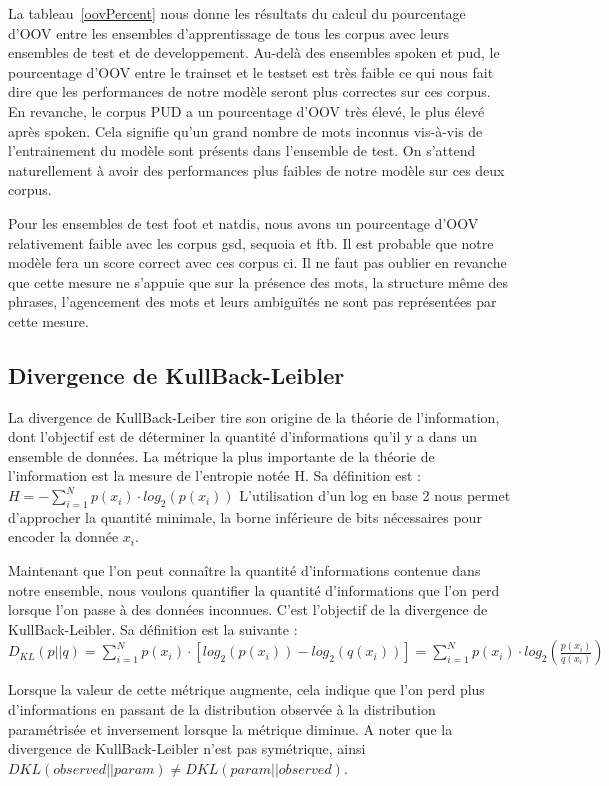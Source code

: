 \documentclass[french, 14pt]{memoir}
\begin{document}
La tableau~\ref{oovPercent} nous donne les résultats du calcul du pourcentage d'OOV entre les ensembles d'apprentissage de tous les corpus avec leurs ensembles de test et de developpement. Au-delà des ensembles spoken et pud, le pourcentage d'OOV entre le trainset et le testset est très faible ce qui nous fait dire que les performances de notre modèle seront plus correctes sur ces corpus. En revanche, le corpus PUD a un pourcentage d'OOV très élevé, le plus élevé après spoken. Cela signifie qu'un grand nombre de mots inconnus vis-à-vis de l'entrainement du modèle sont présents dans l'ensemble de test. On s'attend naturellement à avoir des performances plus faibles de notre modèle sur ces deux corpus. 

Pour les ensembles de test foot et natdis, nous avons un pourcentage d'OOV relativement faible avec les corpus gsd, sequoia et ftb. Il est probable que notre modèle fera un score correct avec ces corpus ci. Il ne faut pas oublier en revanche que cette mesure ne s'appuie que sur la présence des mots, la structure même des phrases, l'agencement des mots et leurs ambiguïtés ne sont pas représentées par cette mesure. 

\subsection{Divergence de KullBack-Leibler}

La divergence de KullBack-Leiber tire son origine de la théorie de l'information, dont l'objectif est de déterminer la quantité d'informations qu'il y a dans un ensemble de données. La métrique la plus importante de la théorie de l'information est la mesure de l'entropie notée H. Sa définition est :
$H = -\sum_{i=1}^{N} p(x_i)\cdot log_2(p(x_i))$ L'utilisation d'un log en base 2 nous permet d'approcher la quantité minimale, la borne inférieure de bits nécessaires pour encoder la donnée $x_i$.

Maintenant que l'on peut connaître la quantité d'informations contenue dans notre ensemble, nous voulons quantifier la quantité d'informations que l'on perd lorsque l'on passe à des données inconnues.
C'est l'objectif de la divergence de KullBack-Leibler. 
Sa définition est la suivante :
$D_{KL}(p||q) = \sum_{i=1}^{N} p(x_i)\cdot [log_2(p(x_i)) - log_2(q(x_i))] = \sum_{i=1}^{N} p(x_i)\cdot log_2(\frac{p(x_i)}{q(x_i)})$

Lorsque la valeur de cette métrique augmente, cela indique que l'on perd plus d'informations en passant de la distribution observée à la distribution paramétrisée et inversement lorsque la métrique diminue. A noter que la divergence de KullBack-Leibler n'est pas symétrique, ainsi $DKL(observed||param) \neq DKL(param||observed)$.
\end{document}
